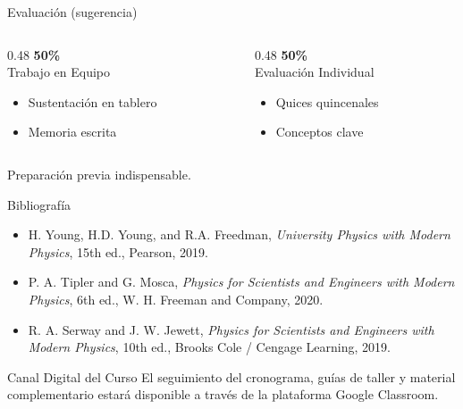 \documentclass[aspectratio=169,xcolor=dvipsnames]{beamer}
\begin{document}
\begin{frame}{Evaluación (sugerencia)}
	\begin{columns}[T]
		\begin{column}{0.48\textwidth}
			\centering
			\textbf{50\%}\\ Trabajo en Equipo
			\begin{itemize}
				\item Sustentación en tablero
				\item Memoria escrita
			\end{itemize}
		\end{column}
		\begin{column}{0.48\textwidth}
			\centering
			\textbf{50\%}\\ Evaluación Individual
			\begin{itemize}
				\item Quices quincenales
				\item Conceptos clave
			\end{itemize}
		\end{column}
	\end{columns}
	
	\vspace{0.3cm}
	\begin{alertblock}{}
		Preparación previa indispensable.
	\end{alertblock}
\end{frame}

\begin{frame}{Bibliografía}
	\begin{itemize}
		\item[1] H. Young, H.D. Young, and R.A. Freedman, \textit{University Physics with Modern Physics}, 15th ed., Pearson, 2019.
		\vspace{0.15cm}
		\item[2] P. A. Tipler and G. Mosca, \textit{Physics for Scientists and Engineers with Modern Physics}, 6th ed., W. H. Freeman and Company, 2020.
		\vspace{0.15cm}
		\item[3] R. A. Serway and J. W. Jewett, \textit{Physics for Scientists and Engineers with Modern Physics}, 10th ed., Brooks Cole / Cengage Learning, 2019.
	\end{itemize}
	
	\vspace{0.4cm}
	\begin{block}{Canal Digital del Curso}
		El seguimiento del cronograma, guías de taller y material complementario estará disponible a través de la plataforma Google Classroom.
	\end{block}
\end{frame}
\end{document}
